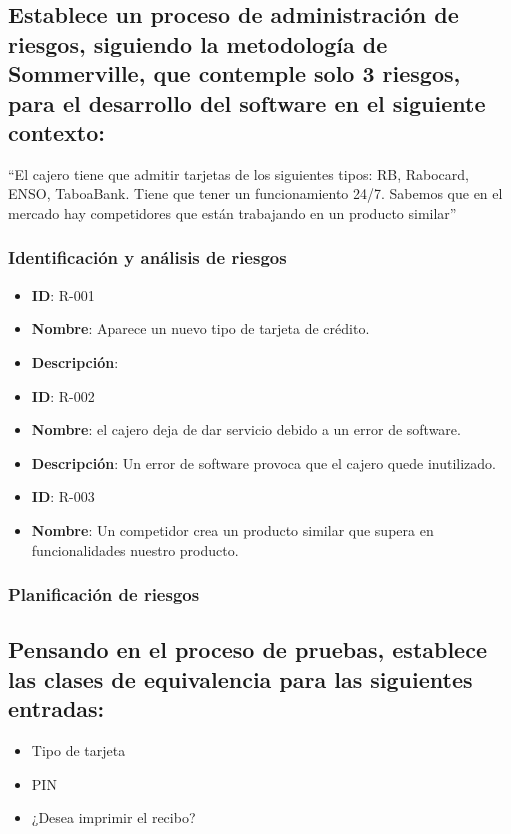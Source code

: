 \subsection{Establece un proceso de administración de riesgos, siguiendo la metodología de Sommerville, que contemple solo 3 riesgos, para el desarrollo del software en el siguiente contexto:}
``El cajero tiene que admitir tarjetas de los siguientes tipos: RB, Rabocard, ENSO, TaboaBank. Tiene que tener un funcionamiento 24/7. Sabemos que en el mercado hay competidores que están trabajando en un producto similar''

\subsubsection{Identificación y análisis de riesgos}
\begin{itemize}
\item \textbf{ID}: R-001
\item \textbf{Nombre}: Aparece un nuevo tipo de tarjeta de crédito.
\item \textbf{Descripción}:
\end{itemize}

\begin{itemize}
    \item \textbf{ID}: R-002
    \item \textbf{Nombre}: el cajero deja de dar servicio debido a un error de software.
    \item \textbf{Descripción}: Un error de software provoca que el cajero quede inutilizado. 
\end{itemize}

\begin{itemize}
    \item \textbf{ID}: R-003
    \item \textbf{Nombre}: Un competidor crea un producto similar que supera en funcionalidades nuestro producto.
\end{itemize}

\subsubsection{Planificación de riesgos}


\subsection{Pensando en el proceso de pruebas, establece las clases de equivalencia para las siguientes entradas:}
\begin{itemize}
    \item Tipo de tarjeta
    \item PIN
    \item ¿Desea imprimir el recibo?
\end{itemize}